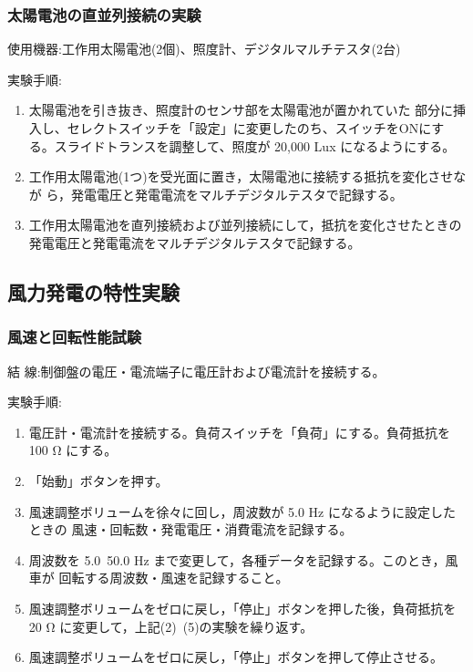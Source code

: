 \documentclass[a4paper,11pt,xelatex,ja=standard]{bxjsarticle}
\begin{document}
        \subsubsection{太陽電池の直並列接続の実験}
            使用機器:工作用太陽電池(2個)、照度計、デジタルマルチテスタ(2台)

            実験手順:
            \begin{enumerate}
                \item 太陽電池を引き抜き、照度計のセンサ部を太陽電池が置かれていた 部分に挿入し、セレクトスイッチを「設定」に変更したのち、スイッチをONにす る。スライドトランスを調整して、照度が 20,000 Lux になるようにする。
                \item 工作用太陽電池(1つ)を受光面に置き，太陽電池に接続する抵抗を変化させなが ら，発電電圧と発電電流をマルチデジタルテスタで記録する。
                \item 工作用太陽電池を直列接続および並列接続にして，抵抗を変化させたときの発電電圧と発電電流をマルチデジタルテスタで記録する。
            \end{enumerate}


    \subsection{風力発電の特性実験}
        \subsubsection{風速と回転性能試験}
            結 線:制御盤の電圧・電流端子に電圧計および電流計を接続する。

            実験手順:
            \begin{enumerate}
                    \item 電圧計・電流計を接続する。負荷スイッチを「負荷」にする。負荷抵抗を100 Ω にする。
                    \item 「始動」ボタンを押す。
                    \item 風速調整ボリュームを徐々に回し，周波数が 5.0 Hz になるように設定したときの 風速・回転数・発電電圧・消費電流を記録する。
                    \item 周波数を 5.0~50.0 Hz まで変更して，各種データを記録する。このとき，風車が 回転する周波数・風速を記録すること。
                    \item 風速調整ボリュームをゼロに戻し，「停止」ボタンを押した後，負荷抵抗を20 Ω に変更して，上記(2)~(5)の実験を繰り返す。
                    \item 風速調整ボリュームをゼロに戻し，「停止」ボタンを押して停止させる。
            \end{enumerate}
\end{document}
